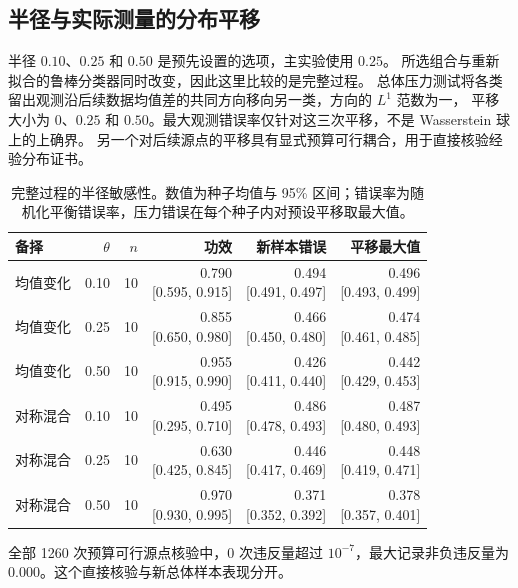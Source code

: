 \documentclass[11pt,a4paper]{article}
\begin{document}
\subsection{半径与实际测量的分布平移}
半径 $0.10$、$0.25$ 和 $0.50$ 是预先设置的选项，主实验使用 $0.25$。
所选组合与重新拟合的鲁棒分类器同时改变，因此这里比较的是完整过程。
总体压力测试将各类留出观测沿后续数据均值差的共同方向移向另一类，方向的 $L^1$ 范数为一，
平移大小为 $0$、$0.25$ 和 $0.50$。最大观测错误率仅针对这三次平移，不是 Wasserstein 球上的上确界。
另一个对后续源点的平移具有显式预算可行耦合，用于直接核验经验分布证书。
\begin{table}[htbp]\centering\small\setlength{\tabcolsep}{3.5pt}
\caption{完整过程的半径敏感性。数值为种子均值与 95\% 区间；错误率为随机化平衡错误率，压力错误在每个种子内对预设平移取最大值。}\label{tab:radius}
\begin{tabularx}{\linewidth}{@{}p{22mm}rrrrr@{}}
\toprule 备择 & $\theta$ & $n$ & 功效 & 新样本错误 & 平移最大值 \\
\midrule
均值变化 & 0.10 & 10 & \shortstack{0.790\\{[0.595, 0.915]}} & \shortstack{0.494\\{[0.491, 0.497]}} & \shortstack{0.496\\{[0.493, 0.499]}} \\
均值变化 & 0.25 & 10 & \shortstack{0.855\\{[0.650, 0.980]}} & \shortstack{0.466\\{[0.450, 0.480]}} & \shortstack{0.474\\{[0.461, 0.485]}} \\
均值变化 & 0.50 & 10 & \shortstack{0.955\\{[0.915, 0.990]}} & \shortstack{0.426\\{[0.411, 0.440]}} & \shortstack{0.442\\{[0.429, 0.453]}} \\
对称混合 & 0.10 & 10 & \shortstack{0.495\\{[0.295, 0.710]}} & \shortstack{0.486\\{[0.478, 0.493]}} & \shortstack{0.487\\{[0.480, 0.493]}} \\
对称混合 & 0.25 & 10 & \shortstack{0.630\\{[0.425, 0.845]}} & \shortstack{0.446\\{[0.417, 0.469]}} & \shortstack{0.448\\{[0.419, 0.471]}} \\
对称混合 & 0.50 & 10 & \shortstack{0.970\\{[0.930, 0.995]}} & \shortstack{0.371\\{[0.352, 0.392]}} & \shortstack{0.378\\{[0.357, 0.401]}} \\
\bottomrule\end{tabularx}\end{table}
全部 1260 次预算可行源点核验中，0 次违反量超过 $10^{-7}$，最大记录非负违反量为 0.000。这个直接核验与新总体样本表现分开。
\end{document}
